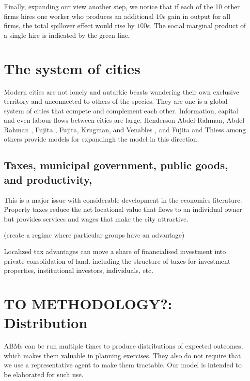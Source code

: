 Finally, expanding our view another step, we notice that if each of the  10 other firms hires one worker who produces an additional  $10\epsilon$ gain in output for all firms, the total spillover effect would rise by $100\epsilon$. The social marginal product of a single hire is indicated by the green line. 



\section{The system of cities}
Modern cities are not lonely and autarkic  beasts wandering their own exclusive territory and unconnected to others of the species. They are one is a global system of cities that compete and complement each other. Information, capital and even labour flows between cities are large. Henderson Abdel-Rahman\cite{Henderson1972Sizes}, Abdel-Rahman \cite{abdel-rahmanAgglomerationEconomiesTypes1990}, Fujita \cite{fujitaMonopolisticCompetitionModel1988}, Fujita, Krugman, and Venables \cite{fujitaSpatialEconomyCities1999}, and Fujita and Thiess \cite{fujitaEconomicsAgglomeration1996} among others provide models for expandingh the model in this direction.



\subsection{Taxes, municipal government, public goods, and productivity,}
This is a major issue with considerable development in the economics literature. Property taxes reduce the net locational value that flows to an individual owner but provides services and wages that make the city attractive. 

(create a regime where particular groups have an advantage)

Localized tax advantages can move a share of financialised investment into private consolidation of land.
including the structure of taxes for investment properties, institutional investors, individuals, etc.




\section{TO  METHODOLOGY?: Distribution}%
ABMs can be run multiple times to produce distributions of expected outcomes, which makes them valuable in planning exercises. They also do not require that we use a representative agent to make them tractable. Our model is intended to be elaborated  for such use. 

